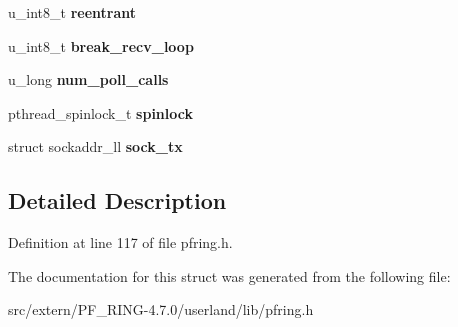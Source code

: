 \begin{DoxyCompactItemize}
\item 
\hypertarget{struct____pfring_aac9fef43754d86b64a71b888092110cd}{
u\_\-int8\_\-t {\bfseries reentrant}}
\label{struct____pfring_aac9fef43754d86b64a71b888092110cd}

\item 
\hypertarget{struct____pfring_aa88015b18db892fff97c8793698b949c}{
u\_\-int8\_\-t {\bfseries break\_\-recv\_\-loop}}
\label{struct____pfring_aa88015b18db892fff97c8793698b949c}

\item 
\hypertarget{struct____pfring_a4a44bc2e2ed7d3dfc9bfad0583631662}{
u\_\-long {\bfseries num\_\-poll\_\-calls}}
\label{struct____pfring_a4a44bc2e2ed7d3dfc9bfad0583631662}

\item 
\hypertarget{struct____pfring_af2479b04cba5ebbb8e8d5076cd8fe88e}{
pthread\_\-spinlock\_\-t {\bfseries spinlock}}
\label{struct____pfring_af2479b04cba5ebbb8e8d5076cd8fe88e}

\item 
\hypertarget{struct____pfring_a620353d21b059ac8308dc1ebf116f5d3}{
struct sockaddr\_\-ll {\bfseries sock\_\-tx}}
\label{struct____pfring_a620353d21b059ac8308dc1ebf116f5d3}

\end{DoxyCompactItemize}


\subsection{Detailed Description}


Definition at line 117 of file pfring.h.



The documentation for this struct was generated from the following file:\begin{DoxyCompactItemize}
\item 
src/extern/PF\_\-RING-\/4.7.0/userland/lib/pfring.h\end{DoxyCompactItemize}
